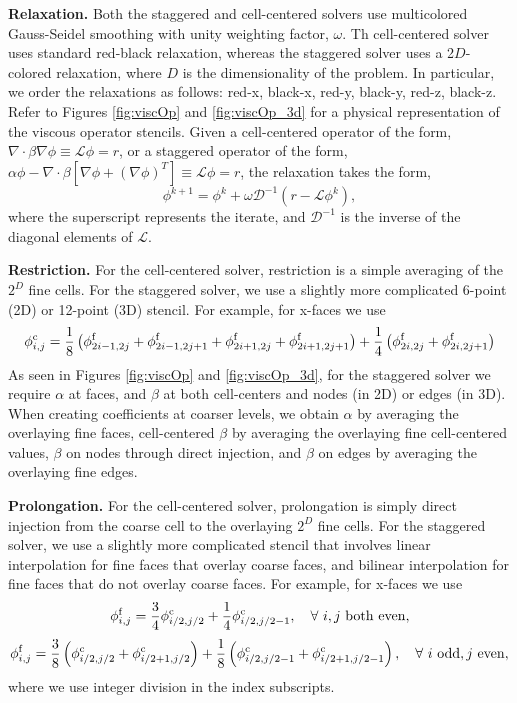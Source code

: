 \documentclass[final]{siamltex}
\begin{document}
{\bf Relaxation.}  Both the staggered and cell-centered solvers use multicolored Gauss-Seidel
smoothing with unity weighting factor, $\omega$.  Th cell-centered solver uses standard red-black
relaxation, whereas the staggered solver uses a 2$D$-colored relaxation,
where $D$ is the dimensionality of the problem.  In particular, we order the relaxations
as follows: red-x, black-x, red-y, black-y, red-z, black-z.
Refer to Figures \ref{fig:viscOp} and \ref{fig:viscOp_3d} for a physical representation
of the viscous operator stencils.
Given a cell-centered operator of the form,
$\nabla\cdot\beta\nabla\phi \equiv \mathcal{L}\phi = r$,
or a staggered operator of the form,
$\alpha\phi - \nabla\cdot\beta[\nabla\phi + (\nabla\phi)^T] \equiv \mathcal{L} \phi = r$,
the relaxation takes the form,
\begin{equation}
\phi^{k+1} = \phi^k + \omega\mathcal{D}^{-1}(r-\mathcal{L}\phi^k),
\end{equation}
where the superscript represents the iterate, and $\mathcal{D}^{-1}$ is the inverse of the
diagonal elements of $\mathcal{L}$.

{\bf Restriction.}  For the cell-centered solver, restriction is a simple averaging of
the $2^D$ fine cells.  For the staggered solver, we use a slightly more complicated
6-point (2D) or 12-point (3D) stencil.  For example, for x-faces we use
\begin{equation}
\phi_{i,j}^{\rm c} = \frac{1}{8}\left(\phi_{2i-1,2j}^{\rm f}+\phi_{2i-1,2j+1}^{\rm f}+\phi_{2i+1,2j}^{\rm f}+\phi_{2i+1,2j+1}^{\rm f}\right) 
+ \frac{1}{4}\left(\phi_{2i,2j}^{\rm f}+\phi_{2i,2j+1}^{\rm f}\right)
\end{equation}
As seen in Figures \ref{fig:viscOp} and \ref{fig:viscOp_3d}, for the staggered
solver we require $\alpha$ at faces, and $\beta$ at both cell-centers and
nodes (in 2D) or edges (in 3D).  When creating coefficients at coarser levels,
we obtain $\alpha$ by averaging the overlaying fine faces, cell-centered $\beta$
by averaging the overlaying fine cell-centered values, $\beta$ on nodes through
direct injection, and $\beta$ on edges by averaging the overlaying fine edges.

{\bf Prolongation.}  For the cell-centered solver, prolongation is simply direct
injection from the coarse cell to the overlaying $2^D$ fine cells.  For the
staggered solver, we use a slightly more complicated stencil that involves linear
interpolation for fine faces that overlay coarse faces, and bilinear interpolation
for fine faces that do not overlay coarse faces.  For example, for x-faces we use
\begin{equation}
\phi_{i,j}^{\rm f} = \frac{3}{4}\phi_{i/2,j/2}^{\rm c} + \frac{1}{4}\phi_{i/2,j/2-1}^{\rm c}, \quad \forall~i,j~{\rm both~even},
\end{equation}
\begin{equation}
\phi_{i,j}^{\rm f} = \frac{3}{8}\left(\phi_{i/2,j/2}^{\rm c}+\phi_{i/2+1,j/2}^{\rm c}\right) + \frac{1}{8}\left(\phi_{i/2,j/2-1}^{\rm c}+\phi_{i/2+1,j/2-1}^{\rm c}\right), \quad \forall~i~{\rm odd},j~{\rm even},
\end{equation}
where we use integer division in the index subscripts.
\end{document}
